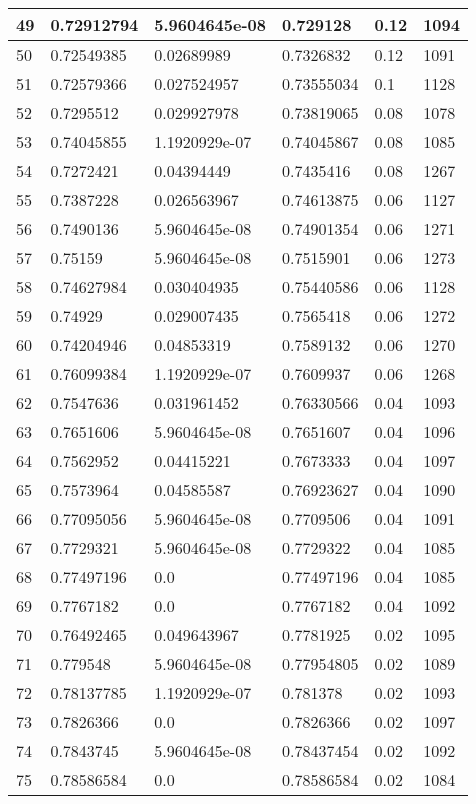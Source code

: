 \begin{longtable}{|l|l|l|l|l|l|}
49 & 0.72912794 & 5.9604645e-08 & 0.729128 & 0.12 & 1094 \\ \hline 
50 & 0.72549385 & 0.02689989 & 0.7326832 & 0.12 & 1091 \\ \hline 
51 & 0.72579366 & 0.027524957 & 0.73555034 & 0.1 & 1128 \\ \hline 
52 & 0.7295512 & 0.029927978 & 0.73819065 & 0.08 & 1078 \\ \hline 
53 & 0.74045855 & 1.1920929e-07 & 0.74045867 & 0.08 & 1085 \\ \hline 
54 & 0.7272421 & 0.04394449 & 0.7435416 & 0.08 & 1267 \\ \hline 
55 & 0.7387228 & 0.026563967 & 0.74613875 & 0.06 & 1127 \\ \hline 
56 & 0.7490136 & 5.9604645e-08 & 0.74901354 & 0.06 & 1271 \\ \hline 
57 & 0.75159 & 5.9604645e-08 & 0.7515901 & 0.06 & 1273 \\ \hline 
58 & 0.74627984 & 0.030404935 & 0.75440586 & 0.06 & 1128 \\ \hline 
59 & 0.74929 & 0.029007435 & 0.7565418 & 0.06 & 1272 \\ \hline 
60 & 0.74204946 & 0.04853319 & 0.7589132 & 0.06 & 1270 \\ \hline 
61 & 0.76099384 & 1.1920929e-07 & 0.7609937 & 0.06 & 1268 \\ \hline 
62 & 0.7547636 & 0.031961452 & 0.76330566 & 0.04 & 1093 \\ \hline 
63 & 0.7651606 & 5.9604645e-08 & 0.7651607 & 0.04 & 1096 \\ \hline 
64 & 0.7562952 & 0.04415221 & 0.7673333 & 0.04 & 1097 \\ \hline 
65 & 0.7573964 & 0.04585587 & 0.76923627 & 0.04 & 1090 \\ \hline 
66 & 0.77095056 & 5.9604645e-08 & 0.7709506 & 0.04 & 1091 \\ \hline 
67 & 0.7729321 & 5.9604645e-08 & 0.7729322 & 0.04 & 1085 \\ \hline 
68 & 0.77497196 & 0.0 & 0.77497196 & 0.04 & 1085 \\ \hline 
69 & 0.7767182 & 0.0 & 0.7767182 & 0.04 & 1092 \\ \hline 
70 & 0.76492465 & 0.049643967 & 0.7781925 & 0.02 & 1095 \\ \hline 
71 & 0.779548 & 5.9604645e-08 & 0.77954805 & 0.02 & 1089 \\ \hline 
72 & 0.78137785 & 1.1920929e-07 & 0.781378 & 0.02 & 1093 \\ \hline 
73 & 0.7826366 & 0.0 & 0.7826366 & 0.02 & 1097 \\ \hline 
74 & 0.7843745 & 5.9604645e-08 & 0.78437454 & 0.02 & 1092 \\ \hline 
75 & 0.78586584 & 0.0 & 0.78586584 & 0.02 & 1084 \\ \hline 
\end{longtable}
